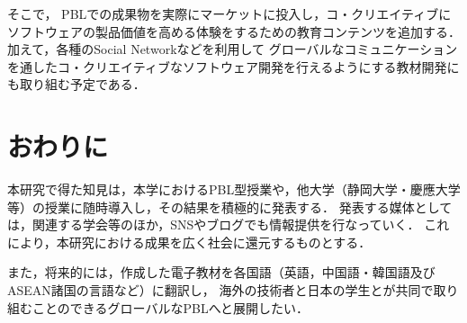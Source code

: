 \documentclass[a4j,twoside]{jarticle}
\begin{document}
\begin{multicols}{2}
	そこで，
	PBLでの成果物を実際にマーケットに投入し，コ・クリエイティブにソフトウェアの製品価値を高める体験をするための教育コンテンツを追加する．
	加えて，各種のSocial Networkなどを利用して
	グローバルなコミュニケーションを通したコ・クリエイティブなソフトウェア開発を行えるようにする教材開発にも取り組む予定である．

\section{おわりに}\label{sec:fin}
	本研究で得た知見は，本学におけるPBL型授業や，他大学（静岡大学・慶應大学等）の授業に随時導入し，その結果を積極的に発表する．
	発表する媒体としては，関連する学会等のほか，SNSやブログでも情報提供を行なっていく．
	これにより，本研究における成果を広く社会に還元するものとする．
	
	また，将来的には，作成した電子教材を各国語（英語，中国語・韓国語及びASEAN諸国の言語など）に翻訳し，
	海外の技術者と日本の学生とが共同で取り組むことのできるグローバルなPBLへと展開したい．


\end{multicols}
\end{document}
